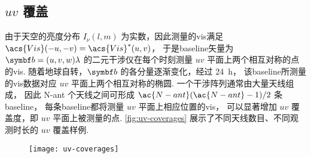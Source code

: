 \subsection{\texorpdfstring{$uv$}{uv} 覆盖}

由于天空的亮度分布 $I_{\nu}(l,m)$ 为实数，因此测量的\ac{vis}满足
$\acs{Vis}(-u,-v) = \acs{Vis}^*(u,v)$，
于是\ac{baseline}矢量为 $\B{b} = (u,v,w)\lambda$ 的二元干涉仪在每个时刻测量
$uv$ 平面上两个相互对称的点的\ac{vis}.
随着地球自转，$\B{b}$ 的各分量逐渐变化，经过 \SI{24}{\hour}，
该\ac{baseline}所测量的\ac{vis}数据对应 $uv$ 平面上两个相互对称的椭圆.
一个干涉阵列通常由大量天线组成，
因此 \ac{N-ant} 个天线之间可形成 $\ac{N-ant}(\ac{N-ant}-1)/2$ 条\ac{baseline}，
每条\ac{baseline}都将测量 $uv$ 平面上相应位置的\ac{vis}，
可以显著增加 $uv$ 覆盖度，即 $uv$ 平面上被测量的点.
\autoref{fig:uv-coverages} 展示了不同天线数目、不同观测时长的 $uv$ 覆盖样例.

\begin{figure}[htp]
  \centering
  \texttt{[image: uv-coverages]}
  \label{fig:uv-coverages}
\end{figure}

